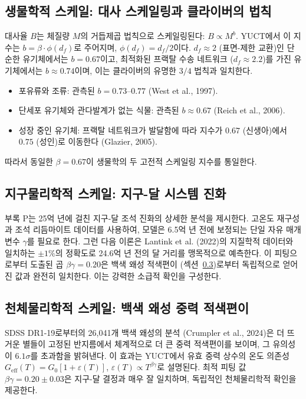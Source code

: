 \documentclass[11pt,a4paper]{article}
\begin{document}
\subsection{생물학적 스케일: 대사 스케일링과 클라이버의 법칙}
\label{subsec:metabolic-scaling}

대사율 $B$는 체질량 $M$의 거듭제곱 법칙으로 스케일링된다: $B \propto M^{b}$. YUCT에서 이 지수는 $b = \beta \cdot \phi(d_f)$로 주어지며, $\phi(d_f) = d_f/2$이다. $d_f \approx 2$ (표면-제한 교환)인 단순한 유기체에서는 $b = 0.67$이고, 최적화된 프랙탈 수송 네트워크 ($d_f \approx 2.2$)를 가진 유기체에서는 $b \approx 0.74$이며, 이는 클라이버의 유명한 $3/4$ 법칙과 일치한다.

\begin{itemize}
\item 포유류와 조류: 관측된 $b = 0.73$–$0.77$ (West et al., 1997).
\item 단세포 유기체와 관다발계가 없는 식물: 관측된 $b \approx 0.67$ (Reich et al., 2006).
\item 성장 중인 유기체: 프랙탈 네트워크가 발달함에 따라 지수가 $0.67$ (신생아)에서 $0.75$ (성인)로 이동한다 (Glazier, 2005).
\end{itemize}

따라서 동일한 $\beta = 0.67$이 생물학의 두 고전적 스케일링 지수를 통일한다.

\subsection{지구물리학적 스케일: 지구-달 시스템 진화}
\label{subsec:earth-moon}

부록 P는 25억 년에 걸친 지구-달 조석 진화의 상세한 분석을 제시한다. 고온도 재구성과 조석 리듬마이트 데이터를 사용하여, 모델은 6.5억 년 전에 보정되는 단일 자유 매개변수 $\gamma$를 필요로 한다. 그런 다음 이론은 Lantink et al. (2022)의 지질학적 데이터와 일치하는 $\pm 1\%$의 정확도로 24.6억 년 전의 달 거리를 맹목적으로 예측한다. 이 피팅으로부터 도출된 곱 $\beta\gamma = 0.20$은 백색 왜성 적색편이 (섹션~\ref{subsec:wd})로부터 독립적으로 얻어진 값과 완전히 일치한다. 이는 강력한 소급적 확인을 구성한다.

\subsection{천체물리학적 스케일: 백색 왜성 중력 적색편이}
\label{subsec:wd}

SDSS DR1-19로부터의 26,041개 백색 왜성의 분석 (Crumpler et al., 2024)은 더 뜨거운 별들이 고정된 반지름에서 체계적으로 더 큰 중력 적색편이를 보이며, 그 유의성이 $6.1\sigma$를 초과함을 밝혀낸다. 이 효과는 YUCT에서 유효 중력 상수의 온도 의존성 $G_{\mathrm{eff}}(T) = G_0[1 + \varepsilon(T)]$, $\varepsilon(T) \propto T^{\beta\gamma}$로 설명된다. 최적 피팅 값 $\beta\gamma = 0.20 \pm 0.03$은 지구-달 결정과 매우 잘 일치하며, 독립적인 천체물리학적 확인을 제공한다.
\end{document}
